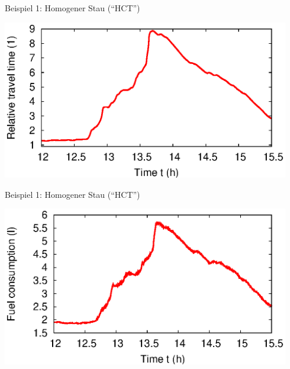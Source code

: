 \documentclass[a4paper]{foils}
\begin{document}
\begin{landscape}
\begin{center}

\centerline{Beispiel 1: Homogener Stau (``HCT'')}

\hspace{0.11\textwidth}
\includegraphics[width=0.94\textwidth]
 {figsAllg/F_0408_1.ASM.tseries.tt_delay.engl.eps}   

\newpage
\centerline{Beispiel 1: Homogener Stau (``HCT'')}

\hspace{0.11\textwidth}
\includegraphics[width=0.94\textwidth]
 {figsAllg/F_0408_1.ASM.tseries.fuel.engl.eps}   


\end{center}
\end{landscape}
\end{document}
